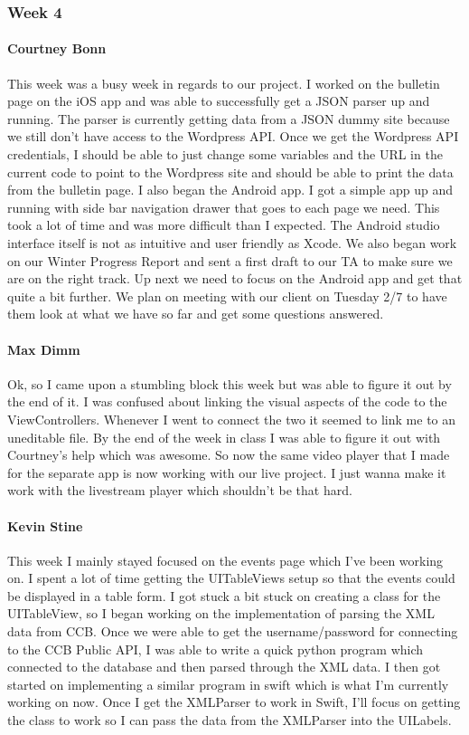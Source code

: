 			
		\subsubsection{Week 4}
		
			\paragraph{Courtney Bonn}
			This week was a busy week in regards to our project. I worked on the bulletin page on the iOS app and was able to successfully get a JSON parser up and running. The parser is currently getting data from a JSON dummy site because we still don't have access to the Wordpress API. Once we get the Wordpress API credentials, I should be able to just change some variables and the URL in the current code to point to the Wordpress site and should be able to print the data from the bulletin page. I also began the Android app. I got a simple app up and running with side bar navigation drawer that goes to each page we need. This took a lot of time and was more difficult than I expected. The Android studio interface itself is not as intuitive and user friendly as Xcode. We also began work on our Winter Progress Report and sent a first draft to our TA to make sure we are on the right track. Up next we need to focus on the Android app and get that quite a bit further. We plan on meeting with our client on Tuesday 2/7 to have them look at what we have so far and get some questions answered.

			\paragraph{Max Dimm}
			Ok, so I came upon a stumbling block this week but was able to figure it out by the end of it. I was confused about linking the visual aspects of the code to the ViewControllers. Whenever I went to connect the two it seemed to link me to an uneditable file. By the end of the week in class I was able to figure it out with Courtney's help which was awesome. So now the same video player that I made for the separate app is now working with our live project. I just wanna make it work with the livestream player which shouldn't be that hard.
			
			\paragraph{Kevin Stine}
			This week I mainly stayed focused on the events page which I've been working on. I spent a lot of time getting the UITableViews setup so that the events could be displayed in a table form. I got stuck a bit stuck on creating a class for the UITableView, so I began working on the implementation of parsing the XML data from CCB. Once we were able to get the username/password for connecting to the CCB Public API, I was able to write a quick python program which connected to the database and then parsed through the XML data. I then got started on implementing a similar program in swift which is what I'm currently working on now. Once I get the XMLParser to work in Swift, I'll focus on getting the class to work so I can pass the data from the XMLParser into the UILabels.
			
